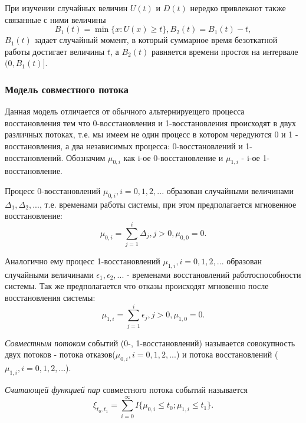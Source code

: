 При изучении случайных величин $U(t)$ и $D(t)$ нередко привлекают также связанные с ними величины
\begin{equation}
B_1(t) = \min\{x : U(x) \geqslant t\}, B_2(t) = B_1(t) - t,
\end{equation}
$B_1(t)$ задает случайный момент,  в  который суммарное время безоткатной работы достигает величины $t$, а $B_2(t)$ равняется времени простоя на интервале $(0, B_1(t)]$.

\begin{center}
\item\subsubsection{Модель совместного потока}
\end{center}
Данная модель отличается от обычного альтернируещего процесса восстановления тем что 0-восстановления и 1-восстановления происходят в двух различных потоках, т.е. мы имеем не один процесс в котором чередуются 0 и 1 - восстановления, а два независимых процесса: 0-восстановлений и 1-восстановлений. Обозначим $\mu_{0,i}$ как i-ое 0-восстановление и $\mu_{1,i}$ - i-ое 1-восстановление.

Процесс 0-восстановлений ${\mu_{0,i}, i = 0,1,2, ...}$ образован случайными величинами $\Delta_1, \Delta_2, ...$, т.е. временами работы системы, при этом предполагается мгновенное восстановление:
\begin{equation}
\mu_{0,i} = \sum_{j=1}^i \Delta_j, j >0, \mu_{0,0} = 0.
\end{equation}

Аналогично ему процесс 1-восстановлений ${\mu_{1,i}, i = 0,1,2, ...}$ образован случайными величинами $\epsilon_1, \epsilon_2, ...$ - временами восстановлений работоспособности системы. Так же предполагается что отказы происходят мгновенно после восстановления системы:
\begin{equation}
\mu_{1,i} = \sum_{j=1}^i \epsilon_j, j >0, \mu_{1,0} = 0.
\end{equation}

\textit{Совместным потоком} событий (0-, 1-восстановлений) называется совокупность двух потоков - потока отказов(${\mu_{0,i}, i = 0,1,2, ...}$) и  потока восстановлений (${\mu_{1,i}, i = 0,1,2, ...}$).

\textit{Считающей функцией пар} совместного потока событий называется
\begin{equation}
\xi_{t_0,t_1} = \sum_{i=0}^\infty I\{\mu_{0,i} \leqslant t_0; \mu_{1,i} \leqslant t_1\}.
\end{equation}

